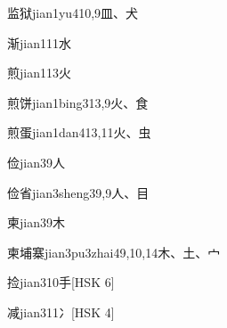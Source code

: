 \begin{EntryWithPhonetic}{监狱}{jian1yu4}{10,9}{⽫、⽝}
\end{EntryWithPhonetic}

\begin{EntryWithPhonetic}{渐}{jian1}{11}{⽔}
\end{EntryWithPhonetic}

\begin{EntryWithPhonetic}{煎}{jian1}{13}{⽕}
\end{EntryWithPhonetic}

\begin{EntryWithPhonetic}{煎饼}{jian1bing3}{13,9}{⽕、⾷}
\end{EntryWithPhonetic}

\begin{EntryWithPhonetic}{煎蛋}{jian1dan4}{13,11}{⽕、⾍}
\end{EntryWithPhonetic}

\begin{EntryWithPhonetic}{俭}{jian3}{9}{⼈}
\end{EntryWithPhonetic}

\begin{EntryWithPhonetic}{俭省}{jian3sheng3}{9,9}{⼈、⽬}
\end{EntryWithPhonetic}

\begin{EntryWithPhonetic}{柬}{jian3}{9}{⽊}
\end{EntryWithPhonetic}

\begin{EntryWithPhonetic}{柬埔寨}{jian3pu3zhai4}{9,10,14}{⽊、⼟、⼧}
\end{EntryWithPhonetic}

\begin{EntryWithPhonetic}{捡}{jian3}{10}{⼿}[HSK 6]
\end{EntryWithPhonetic}

\begin{EntryWithPhonetic}{减}{jian3}{11}{⼎}[HSK 4]
\end{EntryWithPhonetic}

